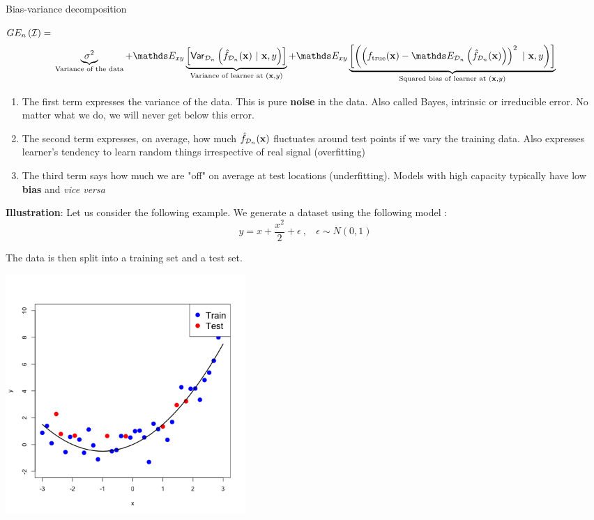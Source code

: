 \documentclass[11pt,compress,t,notes=noshow, xcolor=table]{beamer}
\begin{document}
\begin{vbframe} {Bias-variance decomposition}
\begin{footnotesize}
$GE_n\left(\mathcal{I}\right) =$  
$$
 \underbrace{\sigma^2}_{\text{Variance of the data}} + \E_{xy}\underbrace{\left[\var_{\D_n}\left(\fh_{\D_n}(\xv) ~|~\xv, y\right)\right]}_{\text{Variance of learner at } (\xv, y)} + \E_{xy}\underbrace{\left[\left(\left(\ftrue(\xv)-\E_{\D_n}\left(\fh_{\D_n}(\xv)\right)\right)^2~|~\xv, y\right)\right]}_{\text{Squared bias of learner at } (\xv, y)}  
$$
\end{footnotesize}
\begin{enumerate}
  \item The first term expresses the variance of the data. 
    This is pure \textbf{noise} in the data.
    Also called Bayes, intrinsic or irreducible error.
    No matter what we do, we will never get below this error.
  \item The second term expresses, on average, how much $\hat{f}_{\mathcal{D}_n}(\mathbf{x})$ fluctuates around test points if we vary the training data. Also expresses learner's tendency to learn random things irrespective of real signal (overfitting)
  \item The third term says how much we are "off" on average at test locations (underfitting).
    Models with high capacity typically have low \textbf{bias} and \textit{vice versa}
\end{enumerate}




\framebreak

\textbf{Illustration}: Let us consider the following example. We generate a dataset using the following model : 
$$y = x + \frac{x^2}{2} + \epsilon  \ , \ \ \ \ \epsilon \sim 
N (0, 1)$$

The data is then split into a training set and a test set.

\begin{center}
  \includegraphics[width = 0.4\textwidth]{figure/bias_variance_decomposition-train_test.png}
\end{center}


\end{vbframe}
\end{document}

